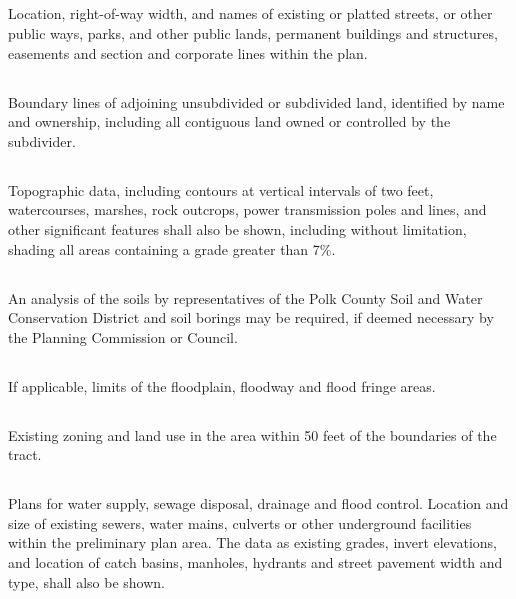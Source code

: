 \subsection{}
Location, right-of-way width, and names of existing or platted streets, or other public ways, parks, and other public lands, permanent buildings and structures, easements and section and corporate lines within the plan.
\subsection{}
Boundary lines of adjoining unsubdivided or subdivided land, identified by name and ownership, including all contiguous land owned or controlled by the subdivider.
\subsection{}
Topographic data, including contours at vertical intervals of two feet, watercourses, marshes, rock outcrops, power transmission poles and lines, and other significant features shall also be shown, including without limitation, shading all areas containing a grade greater than 7\%.
\subsection{}
An analysis of the soils by representatives of the Polk County Soil and Water Conservation District and soil borings may be required, if deemed necessary by the Planning Commission or Council.
\subsection{}
If applicable, limits of the floodplain, floodway and flood fringe areas.
\subsection{}
Existing zoning and land use in the area within 50 feet of the boundaries of the tract.
\subsection{}
Plans for water supply, sewage disposal, drainage and flood control.  Location and size of existing sewers, water mains, culverts or other underground facilities within the preliminary plan area.  The data as existing grades, invert elevations, and location of catch basins, manholes, hydrants and street pavement width and type, shall also be shown.

